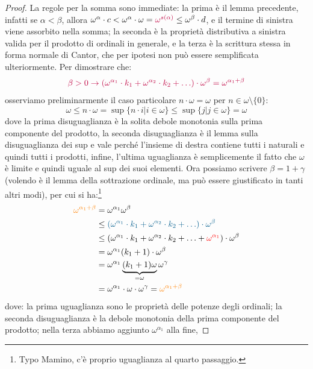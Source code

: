 \begin{proof}
	La regole per la somma sono immediate: la prima \`e il lemma precedente, infatti se $\alpha < \beta$, allora $\omega^\alpha \cdot c < \omega^\alpha \cdot \omega = \textcolor{purple}{\omega^{s(\alpha)}} \leq \omega^{\beta} \cdot d$, e il termine di sinistra viene assorbito nella somma;
	la seconda \`e la propriet\`a distributiva a sinistra valida per il prodotto di ordinali in generale, e la terza \`e la scrittura stessa in forma normale di Cantor, che per ipotesi non pu\`o essere semplificata ulteriormente.
	Per dimostrare che:
	\[ \textcolor{purple}{\beta > 0 \rightarrow (\omega^{\alpha_1}\cdot k_1 + \omega^{\alpha_2} \cdot k_2 + \ldots) \cdot \omega^{\beta} = \omega^{\alpha_1 + \beta}}
		\]
	osserviamo preliminarmente il caso particolare $n \cdot \omega = \omega$ per $n \in \omega\setminus\{0\}$:
	\[ \omega \leq n \cdot \omega = \sup\{n \cdot i | i \in \omega\} \leq \sup\{j | j \in \omega\} = \omega
		\]
	dove la prima disuguaglianza \`e la solita debole monotonia sulla prima componente del prodotto, la seconda disuguaglianza \`e il lemma sulla disuguaglianza dei sup e vale perch\'e l'insieme di destra contiene tutti i naturali e quindi tutti i prodotti,
	infine, l'ultima uguaglianza \`e semplicemente il fatto che $\omega$ \`e limite e quindi uguale al sup dei suoi elementi.
	Ora possiamo scrivere $\beta = 1 + \gamma$ (volendo \`e il lemma della sottrazione ordinale, ma pu\`o essere giustificato in tanti altri modi), per cui si ha:\footnote{Typo Mamino, c'\`e proprio uguaglianza al quarto passaggio.}
	\[ \begin{split}
		\textcolor{orange}{\omega^{\alpha_1 + \beta}} &= \omega^{\alpha_1}\omega^\beta \\
								  &\leq \textcolor{MidnightBlue}{(\omega^{\alpha_1} \cdot k_1 + \omega^{\alpha_2} \cdot k_2 + \ldots) \cdot \omega^{\beta}} \\
								  &\leq (\omega^{\alpha_1} \cdot k_1 + \omega^{\alpha_2} \cdot k_2 + \ldots + \textcolor{red}{\omega^{\alpha_1}}) \cdot \omega^{\beta} \\
								  &= \omega^{\alpha_1}(k_1+1)\cdot \omega^{\beta} \\
		   						  &= \omega^{\alpha_1}\underbrace{(k_1 + 1)\omega}_{=\omega}\omega^{\gamma}\\
		   						  &= \omega^{\alpha_1} \cdot \omega \cdot \omega^{\gamma} = \textcolor{orange}{\omega^{\alpha_1 + \beta}}
 	\end{split}
		\]
	dove: la prima uguaglianza sono le propriet\`a delle potenze degli ordinali; la seconda disuguaglianza \`e la debole monotonia della prima componente del prodotto; nella terza abbiamo aggiunto $\omega^{\alpha_1}$ alla fine,

\end{proof}
